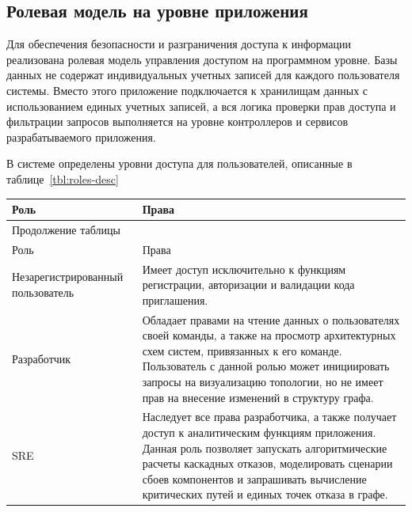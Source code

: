 \subsection{Ролевая модель на уровне приложения}
Для обеспечения безопасности и разграничения доступа к информации реализована ролевая
модель управления доступом на программном уровне. Базы данных не содержат индивидуальных
учетных записей для каждого пользователя системы. Вместо этого приложение подключается к
хранилищам данных с использованием единых учетных записей, а вся логика
проверки прав доступа и фильтрации запросов выполняется на уровне контроллеров и сервисов
разрабатываемого приложения.

В системе определены уровни доступа для пользователей, описанные в таблице~\ref{tbl:roles-desc}

\begin{center}
    \begin{tabularx}{\textwidth}{|X|X|}
        \caption{\label{tbl:roles-desc}Описание ролей системы} \\ \hline
        Роль & Права \\ \hline
        \endfirsthead

        \multicolumn{2}{l}{{Продолжение таблицы\ \thetable{}}} \\ \hline
        Роль & Права \\ \hline
        \endhead

        \hline
        \endfoot
        \endlastfoot

        Незарегистрированный пользователь & Имеет доступ исключительно к функциям
        регистрации, авторизации и валидации кода приглашения. \\ \hline
        
        Разработчик & Обладает правами на чтение данных о пользователях своей
        команды, а также на просмотр архитектурных схем систем, привязанных к его
        команде. Пользователь с данной ролью может инициировать запросы на визуализацию
        топологии, но не имеет прав на внесение изменений в структуру графа. \\ \hline

        SRE & Наследует все права разработчика, а также получает доступ к
        аналитическим функциям приложения. Данная роль позволяет запускать
        алгоритмические расчеты каскадных отказов, моделировать сценарии сбоев
        компонентов и запрашивать вычисление критических путей и единых точек отказа в графе. \\ \hline


\end{tabularx}
\end{center}
